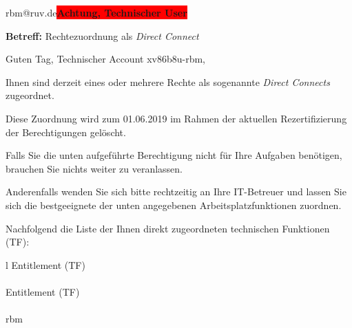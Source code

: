 \documentclass[a4paper,landscape,12pt]{letter}
\begin{document}
\begin{letter}{rbm@ruv.de\space\space\space\space\space\space\space\space\space\bfseries\colorbox{red}{Achtung, Technischer User}\hfill \break}
\begin{normalsize}
	\opening{\textbf{Betreff:} Rechtezuordnung als \emph{Direct Connect}}
	\begin{normalsize} \hfill
	\end{normalsize}

	\begin{normalsize}
		Guten Tag, 
	Technischer Account xv86b8u-rbm, \hfill \break
	\end{normalsize}
	\end{normalsize}
	
\begin{normalsize}
	Ihnen sind derzeit eines oder mehrere Rechte als sogenannte \emph{Direct Connects} zugeordnet.
	
	Diese Zuordnung wird zum 01.06.2019 im Rahmen der aktuellen Rezertifizierung der Berechtigungen gelöscht.
	
	Falls Sie die unten aufgeführte Berechtigung nicht für Ihre Aufgaben benötigen, 
	brauchen Sie nichts weiter zu veranlassen.
	
	Anderenfalls wenden Sie sich bitte rechtzeitig an Ihre IT-Betreuer 
	und lassen Sie sich die bestgeeignete der unten angegebenen Arbeitsplatzfunktionen zuordnen.
	\end{normalsize}
	
\begin{normalsize}
	Nachfolgend die Liste der Ihnen direkt zugeordneten technischen Funktionen (TF):

	\begin{longtable}{l}
		Entitlement (TF) \\ \hline
		\endfirsthead
		\\\hline
		Entitlement (TF) \\ \hline
		\endhead %
		\multicolumn{1}{r@{}}{Fortsetzung \ldots}\\
		\endfoot
		\hline
		\endlastfoot
	rbm\\
	\end{longtable}
	\end{normalsize}
	

\end{letter}
\end{document}
